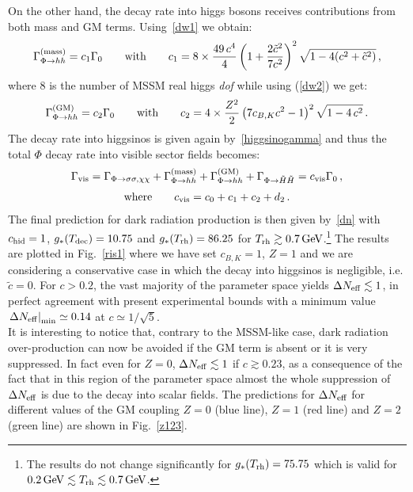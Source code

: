 \documentclass[12pt,a4paper]{book}
\begin{document}
On the other hand, the decay rate into higgs bosons receives contributions from both mass and GM terms. Using~\eqref{dw1} we obtain:
\begin{align}
\Gamma^{\rm (mass)}_{\Phi \rightarrow hh} = c_1 \Gamma_0\qquad\text{with}\qquad c_1 = 8 \times \frac{49 \, c^4}{4} \left(1+\frac{2\tilde{c}^2}{7 c^2}\right)^2\sqrt{1 - 4 (c^2+\tilde{c}^2)}\,, 
\end{align}
where $8$ is the number of MSSM real higgs \textit{dof} while using (\ref{dw2}) we get:
\begin{align}
\Gamma^{\rm (GM)}_{\Phi \rightarrow hh} = c_2 \Gamma_0\qquad\text{with}\qquad c_2 = 4\times\frac{Z^2}{2} \left(7 c_{B,K} c^2  - 1 \right)^2 \sqrt{1 - 4\,c^2}\,.
\end{align}
The decay rate into higgsinos is given again by~\eqref{higgsinogamma} and thus the total $\Phi$ decay rate into visible sector fields becomes:
\begin{align}
\Gamma_{\rm vis} = \Gamma_{\Phi \rightarrow \sigma\sigma,\chi\chi}+\Gamma^{\rm (mass)}_{\Phi \rightarrow hh}+\Gamma^{\rm (GM)}_{\Phi \rightarrow hh}+\Gamma_{\Phi \rightarrow \tilde{H}\tilde{H}}= c_{\rm vis} \Gamma_0 \,,
\end{align}
\begin{align}
\text{where}\qquad c_{\rm vis} = c_0 + c_1 + c_2 + d_2 \,.
\end{align}
The final prediction for dark radiation production is then given by~\eqref{dn} with $c_{\rm hid}=1$, $g_*(T_{\rm dec}) = 10.75$ and $g_*(T_{\rm rh}) = 86.25$ for $T_{\rm rh} \gtrsim 0.7\,{\rm GeV}$.\footnote{The results do not change significantly for $g_*(T_{\rm rh}) = 75.75$ which is valid for $0.2\,{\rm GeV} \lesssim T_{\rm rh} \lesssim 0.7\, {\rm GeV}$.} The results are plotted in Fig.~\ref{ris1} where we have set $c_{B,K}=1$, $Z = 1$ and we are considering a conservative case in which the decay into higgsinos is negligible, i.e. $\tilde{c} = 0$. For $c>0.2$, the vast majority of the parameter space yields $\Delta N_{\rm eff} \lesssim 1$, in perfect agreement with present experimental bounds with a minimum value $\left.\Delta N_{\rm eff}\right|_{\rm min} \simeq 0.14$ at $c \simeq 1/\sqrt{5}$.\\

It is interesting to notice that, contrary to the MSSM-like case, dark radiation over-production can now be avoided if the GM term is absent or it is very suppressed. In fact even for $Z=0$, $\Delta N_{\rm eff} \lesssim 1$ if $c\gtrsim 0.23$, as a consequence of the fact that in this region of the parameter space almost the whole suppression of $\Delta N_{\rm eff}$ is due to the decay into scalar fields. The predictions for $\Delta N_{\rm eff}$ for different values of the GM coupling $Z = 0$ (blue line), $Z = 1$ (red line) and $Z = 2$ (green line) are shown in Fig.~\ref{z123}.\\
\end{document}

